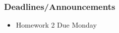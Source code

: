
\begin{frame}
    \frametitle{Deadlines/Announcements}
    \begin{itemize}
        \item Homework 2 Due Monday
    \end{itemize}
\end{frame}
